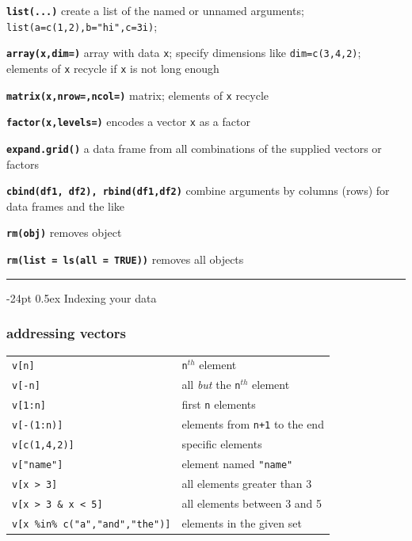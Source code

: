 \documentclass[8pt,landscape]{article}
\makeatletter
\renewcommand\section{\@startsection{section}{1}{0mm}%
                                     {-24pt}%
                                     {0.5ex}%
                                {\color{blue}\normalfont\large\bfseries}}
\newcommand{\code}{\texttt}
\newcommand{\bcode}[1]{\texttt{\textbf{#1}}}
\makeatother
\begin{document}
\begin{multicols*}{3}
\bcode{list(...)} create a list of the named or unnamed arguments;
  \code{list(a=c(1,2),b="hi",c=3i)}; 

\bcode{array(x,dim=)} array with data \code{x}; specify
dimensions like \code{dim=c(3,4,2)}; elements of \code{x} recycle if \code{x}
is not long enough

\bcode{matrix(x,nrow=,ncol=)} matrix; elements of \code{x} recycle

\bcode{factor(x,levels=)} encodes a vector \code{x} as a factor


\bcode{expand.grid()} a data frame from all combinations of the supplied vectors
     or factors

\bcode{cbind(df1, df2), rbind(df1,df2)} combine arguments by columns (rows) for data frames and the like

\smallskip	

\bcode{rm(obj)} removes object

\bcode{rm(list = ls(all = TRUE))} removes all objects

\rule{.3\textwidth}{0.4pt}


\smallskip	

\section{Indexing your data}

\subsubsection{addressing vectors}

\begin{tabular}{@{}l@{\ }l}
\code{v[n]} & \code{n}$^{th}$ element\\
\code{v[-n]} & all \emph{but} the \code{n}$^{th}$ element\\
\code{v[1:n]} & first \code{n} elements\\
\code{v[-(1:n)]} & elements from \code{n+1} to the end\\
\code{v[c(1,4,2)]} & specific elements\\
\code{v["name"]} & element named \code{"name"}\\
\code{v[x > 3]} & all elements greater than 3\\
\code{v[x > 3 \& x < 5]} & all elements between 3 and 5\\
\code{v[x \%in\% c("a","and","the")]} & elements in the given set\\
\end{tabular}


\end{multicols*}
\end{document}
